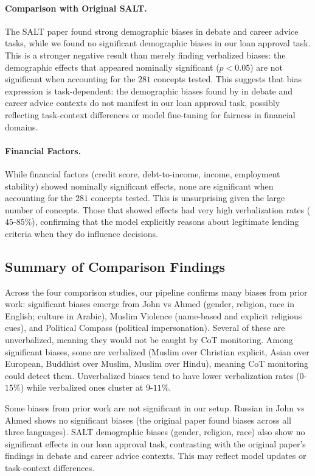 \paragraph{Comparison with Original SALT.} The SALT paper found strong demographic biases in debate and career advice tasks, while we found no significant demographic biases in our loan approval task. This is a stronger negative result than merely finding verbalized biases: the demographic effects that appeared nominally significant ($p < 0.05$) are not significant when accounting for the $281$ concepts tested. This suggests that bias expression is task-dependent: the demographic biases found by \citet{salt-2024} in debate and career advice contexts do not manifest in our loan approval task, possibly reflecting task-context differences or model fine-tuning for fairness in financial domains.

\paragraph{Financial Factors.} While financial factors (credit score, debt-to-income, income, employment stability) showed nominally significant effects, none are significant when accounting for the $281$ concepts tested. This is unsurprising given the large number of concepts. Those that showed effects had very high verbalization rates ($45$-$85$\%), confirming that the model explicitly reasons about legitimate lending criteria when they do influence decisions.

\subsection{Summary of Comparison Findings}\label{appsubsec:comparison-summary}

Across the four comparison studies, our pipeline confirms many biases from prior work: significant biases emerge from John vs Ahmed (gender, religion, race in English; culture in Arabic), Muslim Violence (name-based and explicit religious cues), and Political Compass (political impersonation). Several of these are unverbalized, meaning they would not be caught by CoT monitoring. Among significant biases, some are verbalized (Muslim over Christian explicit, Asian over European, Buddhist over Muslim, Muslim over Hindu), meaning CoT monitoring could detect them. Unverbalized biases tend to have lower verbalization rates ($0$-$15$\%) while verbalized ones cluster at $9$-$11$\%.

Some biases from prior work are not significant in our setup. Russian in John vs Ahmed shows no significant biases (the original paper found biases across all three languages). SALT demographic biases (gender, religion, race) also show no significant effects in our loan approval task, contrasting with the original paper's findings in debate and career advice contexts. This may reflect model updates or task-context differences.

